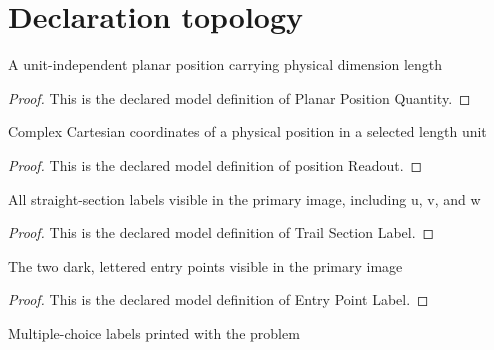 \section{Declaration topology}
\begin{definition}
  \label{def:physics:phyx-mini-0734:phyxminiproblems-problemphyxmini0734-planarpositionquantity}
  A unit-independent planar position carrying physical dimension length
\end{definition}
\begin{proof}
  This is the declared model definition of Planar Position Quantity.
\end{proof}
\begin{definition}
  \label{def:physics:phyx-mini-0734:phyxminiproblems-problemphyxmini0734-positionreadout}
  Complex Cartesian coordinates of a physical position in a selected length unit
\end{definition}
\begin{proof}
  This is the declared model definition of position Readout.
\end{proof}
\begin{definition}
  \label{def:physics:phyx-mini-0734:phyxminiproblems-problemphyxmini0734-trailsectionlabel}
  All straight-section labels visible in the primary image, including u, v, and w
\end{definition}
\begin{proof}
  This is the declared model definition of Trail Section Label.
\end{proof}
\begin{definition}
  \label{def:physics:phyx-mini-0734:phyxminiproblems-problemphyxmini0734-entrypointlabel}
  The two dark, lettered entry points visible in the primary image
\end{definition}
\begin{proof}
  This is the declared model definition of Entry Point Label.
\end{proof}
\begin{definition}
  \label{def:physics:phyx-mini-0734:phyxminiproblems-problemphyxmini0734-answerchoice}
  Multiple-choice labels printed with the problem
\end{definition}
